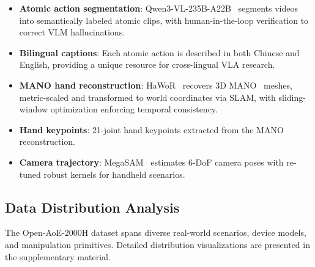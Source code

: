 \begin{itemize}
    \item \textbf{Atomic action segmentation}: Qwen3-VL-235B-A22B~\cite{qwen2025vl} segments videos into semantically labeled atomic clips, with human-in-the-loop verification to correct VLM hallucinations.
    \item \textbf{Bilingual captions}: Each atomic action is described in both Chinese and English, providing a unique resource for cross-lingual VLA research.
    \item \textbf{MANO hand reconstruction}: HaWoR~\cite{hawor2025} recovers 3D MANO~\cite{mano2017} meshes, metric-scaled and transformed to world coordinates via SLAM, with sliding-window optimization enforcing temporal consistency.
    \item \textbf{Hand keypoints}: 21-joint hand keypoints extracted from the MANO reconstruction.
    \item \textbf{Camera trajectory}: MegaSAM~\cite{megasam2024} estimates 6-DoF camera poses with re-tuned robust kernels for handheld scenarios.
\end{itemize}

\subsection{Data Distribution Analysis}


The Open-AoE-2000H dataset spans diverse real-world scenarios, device models, and manipulation primitives. Detailed distribution visualizations are presented in the supplementary material.
